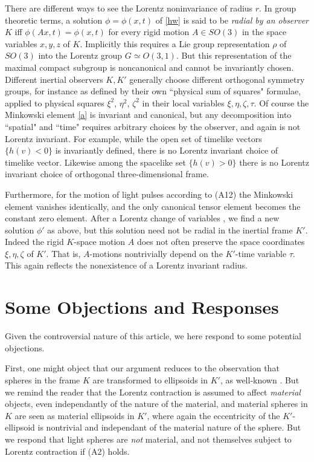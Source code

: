\documentclass[12pt]{amsart}
\theoremstyle{definition}
\theoremstyle{remark}
\begin{document}
There are different ways to see the Lorentz noninvariance of radius $r$. In group theoretic terms, a solution $\phi=\phi(x,t)$ of \eqref{hw} is said to be \emph{radial by an observer $K$} iff $\phi(Ax,t)=\phi(x,t)$ for every rigid motion $A\in SO(3)$ in the space variables $x,y,z$ of $K$. Implicitly this requires a Lie group representation $\rho$ of $SO(3)$ into the Lorentz group $G\simeq O(3,1)$. But this representation of the maximal compact subgroup is noncanonical and cannot be invariantly chosen. Different inertial observers $K, K'$ generally choose different orthogonal symmetry groups, for instance as defined by their own ``physical sum of squares" formulae, applied to physical squares $\xi^2$, $\eta^2$, $\zeta^2$ in their local variables $\xi, \eta, \zeta, \tau$. Of course the Minkowski element \eqref{a} is invariant and canonical, but any decomposition into ``spatial" and ``time" requires arbitrary choices by the observer, and again is not Lorentz invariant. For example, while the open set of timelike vectors $\{h(v)<0\}$ is invariantly defined, there is no Lorentz invariant choice of timelike vector. Likewise among the spacelike set $\{h(v)>0\}$ there is no Lorentz invariant choice of orthogonal three-dimensional frame. 

Furthermore, for the motion of light pulses according to (A12) the Minkowski element vanishes identically, and the only canonical tensor element becomes the constant zero element. After a Lorentz change of variables , we find a new solution $\phi'$ as above, but this solution need not be radial in the inertial frame $K'$. Indeed the rigid $K$-space motion $A$ does not often preserve the space coordinates $\xi, \eta, \zeta$ of $K'$. That is, $A$-motions nontrivially depend on the $K'$-time variable $\tau$. This again reflects the nonexistence of a Lorentz invariant radius.








\section{Some Objections and Responses}
Given the controversial nature of this article, we here respond to some potential objections. 

First, one might object that our argument reduces to the observation that spheres in the frame $K$ are transformed to ellipsoids in $K'$, as well-known \cite[\S 4]{einstein1905electrodynamics}. But we remind the reader that the Lorentz contraction is assumed to affect \emph{material} objects, even independantly of the nature of the material, and material spheres in $K$ are seen as material ellipsoids in $K'$, where again the eccentricity of the $K'$-ellipsoid is nontrivial and independant of the material nature of the sphere. But we respond that light spheres are \emph{not} material, and not themselves subject to Lorentz contraction if (A2) holds.  %
\end{document}
